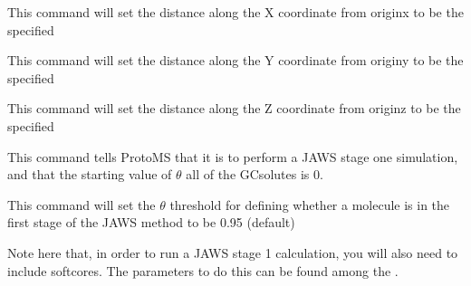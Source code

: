 \documentclass[letterpaper,10pt,english]{sphinxmanual}
\begin{document}
%
\begin{sphinxVerbatim}[commandchars=\\\{\}]
 
\end{sphinxVerbatim}

This command will set the distance along the X coordinate from originx to be the specified 

%
\begin{sphinxVerbatim}[commandchars=\\\{\}]
 
\end{sphinxVerbatim}

This command will set the distance along the Y coordinate from originy to be the specified 

%
\begin{sphinxVerbatim}[commandchars=\\\{\}]
 
\end{sphinxVerbatim}

This command will set the distance along the Z coordinate from originz to be the specified 

\ignorespaces 
\def\sphinxLiteralBlockLabel{\label{\detokenize{protoms:index-59}}}
%
\begin{sphinxVerbatim}[commandchars=\\\{\}]
 
\end{sphinxVerbatim}

This command tells ProtoMS that it is to perform a JAWS stage one simulation, and that the starting value of \(\theta\) all of the GCsolutes is 0.

\ignorespaces 
\def\sphinxLiteralBlockLabel{\label{\detokenize{protoms:index-60}}}
%
\begin{sphinxVerbatim}[commandchars=\\\{\}]
 
\end{sphinxVerbatim}

This command will set the \(\theta\) threshold for defining whether a molecule is  in the first stage of the JAWS method to be 0.95 (default)

Note here that, in order to run a JAWS stage 1 calculation, you will also need to include softcores. The parameters to do this can be found among the {\hyperref[\detokenize{protoms:free-energy-calculation-parameters}]{}}.
\end{document}
